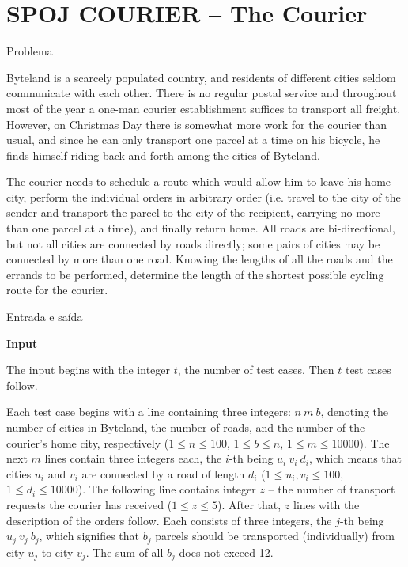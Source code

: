 \section{SPOJ COURIER -- The Courier}

\begin{frame}[fragile]{Problema}


Byteland is a scarcely populated country, and residents of different cities seldom communicate with
each other. There is no regular postal service and throughout most of the year a one-man courier
establishment suffices to transport all freight. However, on Christmas Day there is somewhat more
work for the courier than usual, and since he can only transport one parcel at a time on his
bicycle, he finds himself riding back and forth among the cities of Byteland.

The courier needs to schedule a route which would allow him to leave his home city, perform the 
individual orders in arbitrary order (i.e. travel to the city of the sender and transport the 
parcel to the city of the recipient, carrying no more than one parcel at a time), and finally 
return home. All roads are bi-directional, but not all cities are connected by roads directly; some 
pairs of cities may be connected by more than one road. Knowing the lengths of all the roads and 
the errands to be performed, determine the length of the shortest possible cycling route for the 
courier.

\end{frame}

\begin{frame}[fragile]{Entrada e saída}

\textbf{Input}

The input begins with the integer $t$, the number of test cases. Then $t$ test cases follow.

Each test case begins with a line containing three integers: $n\ m\ b$, denoting the number of 
cities in Byteland, the number of roads, and the number of the courier's home city, respectively
($1\leq n\leq 100$, $1\leq b\leq n$, $1\leq m\leq 10000$). The next $m$ lines contain three integers 
each, the $i$-th being $u_i\ v_i\ d_i$, which means that cities $u_i$ and $v_i$ are connected by a 
road of length $d_i$ ($1\leq u_i, v_i\leq 100$, $1\leq d_i\leq 10000$). The following line contains 
integer $z$ -- the number of transport requests the courier has received ($1\leq z\leq 5$). After 
that, $z$ lines with the description of the orders follow. Each consists of three integers, the 
$j$-th being $u_j\ v_j\ b_j$, which signifies that $b_j$ parcels should be transported 
(individually) from city $u_j$ to city $v_j$. The sum of all $b_j$ does not exceed 12.

\end{frame}

